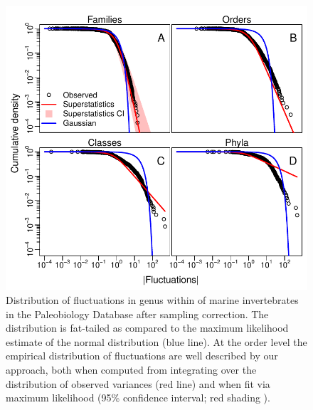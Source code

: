 \documentclass[12pt]{article}
\let\citep=\cite
\providecommand{\DIFadd}[1]{{\color{blue}{#1}}} %
\providecommand{\DIFdel}[1]{{\protect\color{red}\sout{}}}                      %
\providecommand{\DIFaddFL}[1]{\DIFadd{#1}} %
\providecommand{\DIFdelFL}[1]{\DIFdel{#1}} %
\providecommand{\DIFaddbeginFL}{} %
\providecommand{\DIFaddendFL}{} %
\providecommand{\DIFdelbeginFL}{} %
\providecommand{\DIFdelendFL}{} %
\newcommand{\DIFscaledelfig}{0.5}
\newlength{\DIFdelgraphicswidth} %
\newlength{\DIFdelgraphicsheight} %
\newcommand{\DIFaddincludegraphics}[2][]{{\color{blue}\fbox{\DIFOincludegraphics[#1]{#2}}}} %
\newcommand{\DIFdelincludegraphics}[2][]{%
\sbox{\DIFdelgraphicsbox}{\DIFOincludegraphics[#1]{#2}}%
\settoboxwidth{\DIFdelgraphicswidth}{\DIFdelgraphicsbox} %
\settoboxtotalheight{\DIFdelgraphicsheight}{\DIFdelgraphicsbox} %
\scalebox{\DIFscaledelfig}{%
\parbox[b]{\DIFdelgraphicswidth}{\usebox{\DIFdelgraphicsbox}\\[-\baselineskip] \rule{\DIFdelgraphicswidth}{0em}}\llap{\resizebox{\DIFdelgraphicswidth}{\DIFdelgraphicsheight}{%
\setlength{\unitlength}{\DIFdelgraphicswidth}%
\begin{picture}(1,1)%
\thicklines\linethickness{2pt} %
{\color[rgb]{1,0,0}\put(0,0){\framebox(1,1){}}}%
{\color[rgb]{1,0,0}\put(0,0){\line( 1,1){1}}}%
{\color[rgb]{1,0,0}\put(0,1){\line(1,-1){1}}}%
\end{picture}%
}\hspace*{3pt}}} %
} %
\DeclareRobustCommand{\DIFaddbeginFL}{\DIFOaddbeginFL \let\includegraphics\DIFaddincludegraphics} %
\DeclareRobustCommand{\DIFaddendFL}{\DIFOaddendFL \let\includegraphics\DIFOincludegraphics} %
\DeclareRobustCommand{\DIFdelbeginFL}{\DIFOdelbeginFL \let\includegraphics\DIFdelincludegraphics} %
\DeclareRobustCommand{\DIFdelendFL}{\DIFOaddendFL \let\includegraphics\DIFOincludegraphics} %
\begin{document}
\begin{figure}[!h]
  \centering
  \DIFdelbeginFL %
\DIFdelendFL \DIFaddbeginFL \includegraphics[scale=1]{../../fig_Px.pdf} 
  \caption[Clade-level distribution of richness
  fluctuations]{\DIFaddendFL Distribution of fluctuations in genus \DIFdelbeginFL \DIFdelFL{diversity }\DIFdelendFL \DIFaddbeginFL \DIFaddFL{richness }\DIFaddendFL within
    \DIFdelbeginFL \DIFdelFL{orders }\DIFdelendFL \DIFaddbeginFL \DIFaddFL{different taxonomic groupings }\DIFaddendFL of marine invertebrates in the
    Paleobiology Database \citep{alroy08} after sampling
    correction. The distribution is fat-tailed as compared to the
    maximum likelihood estimate of the normal distribution (blue
    line).  At the \DIFaddbeginFL \DIFaddFL{family and }\DIFaddendFL order level the empirical distribution
    of fluctuations are well described by our \DIFdelbeginFL \DIFdelFL{super-statistical }\DIFdelendFL \DIFaddbeginFL \DIFaddFL{superstatistical
    }\DIFaddendFL approach, both when computed from integrating over the
    distribution of observed variances (red line) and when fit via
    maximum likelihood (95\% confidence interval; red shading \DIFaddbeginFL \DIFaddFL{in
    (A}\DIFaddendFL )\DIFaddbeginFL \DIFaddFL{)}\DIFaddendFL .}
  \label{fig:Px}
\end{figure}
\end{document}

